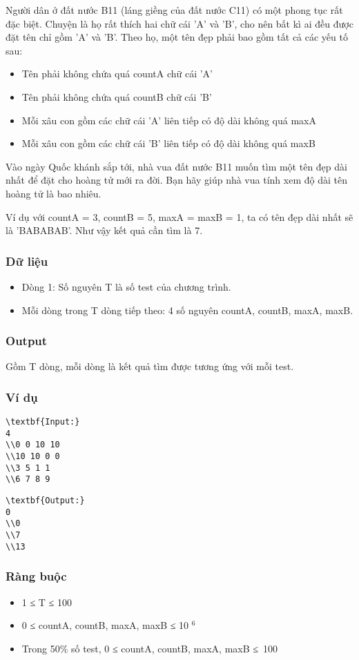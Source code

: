 



   Người dân ở đất nước B11 (láng giềng của đất nước C11) có một phong tục rất đặc biệt. Chuyện là họ rất thích hai chữ cái 'A' và 'B', cho nên bất kì ai đều được đặt tên chỉ gồm 'A' và 'B'. Theo họ, một tên đẹp phải bao gồm tất cả các yếu tố sau:  
\begin{itemize}
	\item     Tên phải không chứa quá countA chữ cái 'A'   
	\item     Tên phải không chứa quá countB chữ cái 'B'   
	\item     Mỗi xâu con gồm các chữ cái 'A' liên tiếp có độ dài không quá maxA   
	\item     Mỗi xâu con gồm các chữ cái 'B' liên tiếp có độ dài không quá maxB   
\end{itemize}

   Vào ngày Quốc khánh sắp tới, nhà vua đất nước B11 muốn tìm một tên đẹp dài nhất để đặt cho hoàng tử mới ra đời. Bạn hãy giúp nhà vua tính xem độ dài tên hoàng tử là bao nhiêu.  

   Ví dụ với countA = 3, countB = 5, maxA = maxB = 1, ta có tên đẹp dài nhất sẽ là 'BABABAB'. Như vậy kết quả cần tìm là 7.  

\subsubsection{   Dữ liệu  }
\begin{itemize}
	\item     Dòng 1: Số nguyên T là số test của chương trình.   
	\item     Mỗi dòng trong T dòng tiếp theo: 4 số nguyên countA, countB, maxA, maxB.   
\end{itemize}

\subsubsection{   Output  }

   Gồm T dòng, mỗi dòng là kết quả tìm được tương ứng với mỗi test.  

\subsubsection{   Ví dụ  }
\begin{verbatim}
\textbf{Input:}
4
\\0 0 10 10
\\10 10 0 0
\\3 5 1 1
\\6 7 8 9 \end{verbatim}
\begin{verbatim}
\textbf{Output:}
0
\\0
\\7
\\13 \end{verbatim}

\subsubsection{   Ràng buộc  }
\begin{itemize}
	\item     1 ≤ T ≤ 100   
	\item     0 ≤ countA, countB, maxA, maxB ≤ 10    $^     6    $
	\item     Trong 50\% số test, 0 ≤ countA, countB, maxA, maxB ≤ 100   
\end{itemize}